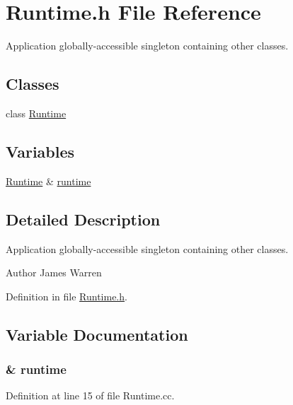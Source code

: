 \section{Runtime.\-h File Reference}
\label{_runtime_8h}


Application globally-\/accessible singleton containing other classes.  


\subsection*{Classes}
\begin{DoxyCompactItemize}
\item 
class \hyperlink{class_runtime}{Runtime}
\end{DoxyCompactItemize}
\subsection*{Variables}
\begin{DoxyCompactItemize}
\item 
\hyperlink{class_runtime}{Runtime} \& \hyperlink{_runtime_8h_af1705ecc1d279440da4c3de49513a725}{runtime}
\end{DoxyCompactItemize}


\subsection{Detailed Description}
Application globally-\/accessible singleton containing other classes. \begin{DoxyAuthor}{Author}
James Warren 
\end{DoxyAuthor}


Definition in file \hyperlink{_runtime_8h_source}{Runtime.\-h}.



\subsection{Variable Documentation}
\subsubsection[{runtime}]{\& runtime}\label{_runtime_8h_af1705ecc1d279440da4c3de49513a725}


Definition at line 15 of file Runtime.\-cc.

